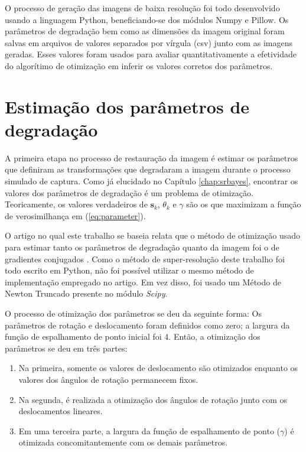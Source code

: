 O processo de geração das imagens de baixa resolução foi todo desenvolvido usando a linguagem Python,
beneficiando-se dos módulos Numpy e Pillow.
Os parâmetros de degradação bem como as dimensões da imagem original foram salvas em arquivos de valores separados por vírgula (csv) junto com as imagens geradas.
Esses valores foram usados para avaliar quantitativamente a efetividade do algorítimo de
otimização em inferir os valores corretos dos parâmetros.

\section{Estimação dos parâmetros de degradação}
\label{sec:parestimation}
A primeira etapa no processo de restauração da imagem é estimar os parâmetros que definiram as transformações que degradaram a imagem durante o processo simulado de captura. Como já elucidado no Capítulo \ref{chap:srbayes}, encontrar os valores dos parâmetros de degradação é um problema de otimização.
Teoricamente, os valores verdadeiros de $\mathbf{s}_k$, $\theta_k$ e $\gamma$ são os que maximizam a função de verosimilhança em (\ref{eq:parameter}).


O artigo no qual este trabalho se baseia relata que o método de otimização usado
para estimar tanto os parâmetros de degradação quanto da imagem foi o de gradientes
conjugados \cite{tipping2003bayesian}.
Como o método de super-resolução deste trabalho foi todo escrito em Python,
não foi possível utilizar o mesmo método de implementação empregado no artigo.
Em vez disso, foi usado um Método de Newton Truncado \cite{nocedal1999optimization} presente no módulo \emph{Scipy}.


O processo de otimização dos parâmetros se deu da seguinte forma:
Os parâmetros de rotação e deslocamento foram definidos como zero;
a largura da função de espalhamento de ponto inicial foi 4.
Então, a otimização dos parâmetros se deu em três partes:
\begin{enumerate}
	\item Na primeira, somente os valores de deslocamento são otimizados enquanto os valores dos ângulos de rotação permanecem fixos.
	\item Na segunda, é realizada a otimização dos ângulos de rotação junto com os deslocamentos lineares.
	\item Em uma terceira parte, a largura da função de espalhamento de ponto ($\gamma$) é otimizada concomitantemente com os demais parâmetros.
\end{enumerate}

